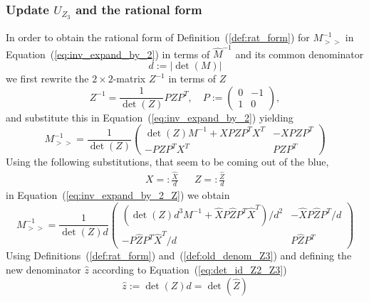 \documentclass[a4paper]{article}
\begin{document}
\subsubsection{Update $U_{Z_{3}}$ and the rational form}
In order to obtain the rational form of Definition~(\ref{def:rat_form})
for $M_{>>}^{-1}$ in
Equation~(\ref{eq:inv_expand_by_2}) in terms of $\hat{M}^{-1}$
and its common denominator
\begin{equation}
\label{def:old_denom_Z3}
d:=\left|\det\left(M\right)\right|
\end{equation}
we first rewrite the $2 \times 2$-matrix $Z^{-1}$ in terms of $Z$
\begin{equation}
Z^{-1}=\frac{1}{\det\left(Z\right)}PZP^{T}, \quad
P:=
\left(
\begin{array}{cr}
0 & -1 \\
1 & 0
\end{array}
\right),
\end{equation}
and substitute this in Equation~(\ref{eq:inv_expand_by_2}) yielding
\begin{equation}
\label{eq:inv_expand_by_2_Z}
M_{>>}^{-1}=
\frac{1}{\det\left(Z\right)}
\left(
\begin{array}{c|c}
\det\left(Z\right)M^{-1} + XPZP^{T}X^{T} & -XPZP^{T} \\
\hline
-PZP^{T}X^{T}     & PZP^{T}
\end{array}
\right)
\end{equation}
Using the following substitutions, that seem to be coming out of the blue, 
\begin{eqnarray}
\label{def:X_hat_Z_hat}
X=:\frac{\hat{X}}{d} & & Z=:\frac{\hat{Z}}{d}
\end{eqnarray}
in Equation~(\ref{eq:inv_expand_by_2_Z}) we obtain
\begin{equation}
\label{eq:inv_expand_2_Z3}
M_{>>}^{-1}=
\frac{1}{\det\left(Z\right)d}
\left(
\begin{array}{c|c}
(\det\left(Z\right)d^{3}M^{-1}+\hat{X}P\hat{Z}P^{T}\hat{X}^{T})/ d^{2} &
-\hat{X}P\hat{Z}P^{T}/d  \\
\hline
-P\hat{Z}P^{T}\hat{X}^{T}/d & P\hat{Z}P^{T} 
\end{array}
\right)
\end{equation}
Using Definitions~(\ref{def:rat_form}) and~(\ref{def:old_denom_Z3})
and defining the new denominator $\hat{z}$ according to 
Equation~(\ref{eq:det_id_Z2_Z3})
\begin{equation}
\label{def:new_denom_Z3}
\hat{z}:=\det\left(Z\right) d = \det(\hat{Z})
\end{equation}
\end{document}
